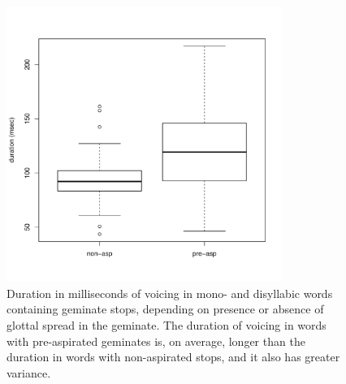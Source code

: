 \documentclass[11pt,a4paper,openany]{memoir}\usepackage[]{graphicx}\usepackage[]{color}
\newenvironment{knitrout}{}{} %
\begin{document}
\begin{figure}
\centering
\begin{knitrout}
\color{fgcolor}
\includegraphics[width=0.8\textwidth]{img/voicing-stop-1} 

\end{knitrout}
\caption[Duration in milliseconds of voicing in mono- and disyllabic words containing geminate stops.]{Duration in milliseconds of voicing in mono- and disyllabic words containing geminate stops, depending on presence or absence of glottal spread in the geminate.
The duration of voicing in words with pre-aspirated geminates is, on average, longer than the duration in words with non-aspirated stops, and it also has greater variance.
}
\label{f:voicdur}
\end{figure}
\end{document}
